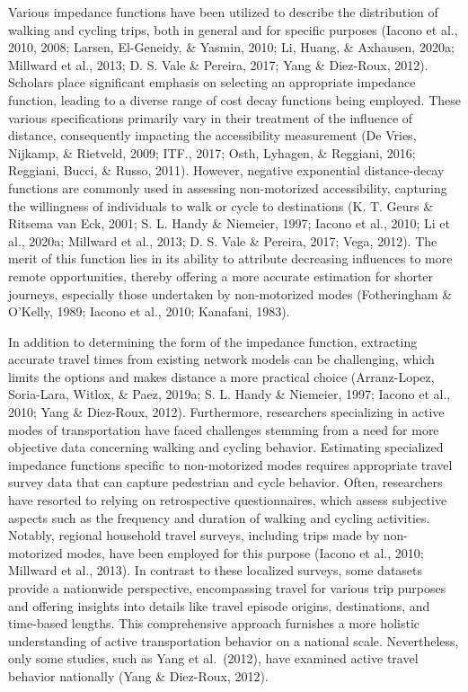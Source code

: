 \documentclass[12pt,twoside]{reedthesis}
\begin{document}
Various impedance functions have been utilized to describe the distribution of walking and cycling trips, both in general and for specific purposes (Iacono et al., 2010, 2008; Larsen, El-Geneidy, \& Yasmin, 2010; Li, Huang, \& Axhausen, 2020a; Millward et al., 2013; D. S. Vale \& Pereira, 2017; Yang \& Diez-Roux, 2012). Scholars place significant emphasis on selecting an appropriate impedance function, leading to a diverse range of cost decay functions being employed. These various specifications primarily vary in their treatment of the influence of distance, consequently impacting the accessibility measurement (De Vries, Nijkamp, \& Rietveld, 2009; ITF., 2017; Osth, Lyhagen, \& Reggiani, 2016; Reggiani, Bucci, \& Russo, 2011). However, negative exponential distance-decay functions are commonly used in assessing non-motorized accessibility, capturing the willingness of individuals to walk or cycle to destinations (K. T. Geurs \& Ritsema van Eck, 2001; S. L. Handy \& Niemeier, 1997; Iacono et al., 2010; Li et al., 2020a; Millward et al., 2013; D. S. Vale \& Pereira, 2017; Vega, 2012). The merit of this function lies in its ability to attribute decreasing influences to more remote opportunities, thereby offering a more accurate estimation for shorter journeys, especially those undertaken by non-motorized modes (Fotheringham \& O'Kelly, 1989; Iacono et al., 2010; Kanafani, 1983).

In addition to determining the form of the impedance function, extracting accurate travel times from existing network models can be challenging, which limits the options and makes distance a more practical choice (Arranz-Lopez, Soria-Lara, Witlox, \& Paez, 2019a; S. L. Handy \& Niemeier, 1997; Iacono et al., 2010; Yang \& Diez-Roux, 2012). Furthermore, researchers specializing in active modes of transportation have faced challenges stemming from a need for more objective data concerning walking and cycling behavior. Estimating specialized impedance functions specific to non-motorized modes requires appropriate travel survey data that can capture pedestrian and cycle behavior. Often, researchers have resorted to relying on retrospective questionnaires, which assess subjective aspects such as the frequency and duration of walking and cycling activities. Notably, regional household travel surveys, including trips made by non-motorized modes, have been employed for this purpose (Iacono et al., 2010; Millward et al., 2013). In contrast to these localized surveys, some datasets provide a nationwide perspective, encompassing travel for various trip purposes and offering insights into details like travel episode origins, destinations, and time-based lengths. This comprehensive approach furnishes a more holistic understanding of active transportation behavior on a national scale. Nevertheless, only some studies, such as Yang et al.~(2012), have examined active travel behavior nationally (Yang \& Diez-Roux, 2012).
\end{document}

